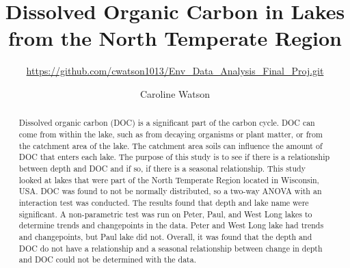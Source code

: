 \documentclass[12pt,]{article}
\title{Dissolved Organic Carbon in Lakes from the North Temperate Region}
\subtitle{\url{https://github.com/cwatson1013/Env_Data_Analysis_Final_Proj.git}}
\author{Caroline Watson}
\date{}
\begin{document}
\maketitle
\begin{abstract}
Dissolved organic carbon (DOC) is a significant part of the carbon
cycle. DOC can come from within the lake, such as from decaying
organisms or plant matter, or from the catchment area of the lake. The
catchment area soils can influence the amount of DOC that enters each
lake. The purpose of this study is to see if there is a relationship
between depth and DOC and if so, if there is a seasonal relationship.
This study looked at lakes that were part of the North Temperate Region
located in Wisconsin, USA. DOC was found to not be normally distributed,
so a two-way ANOVA with an interaction test was conducted. The results
found that depth and lake name were significant. A non-parametric test
was run on Peter, Paul, and West Long lakes to determine trends and
changepoints in the data. Peter and West Long lake had trends and
changepoints, but Paul lake did not. Overall, it was found that the
depth and DOC do not have a relationship and a seasonal relationship
between change in depth and DOC could not be determined with the data.
\end{abstract}

\newpage

\tableofcontents  \newpage
\listoftables  \newpage
\listoffigures  \newpage
\end{document}

